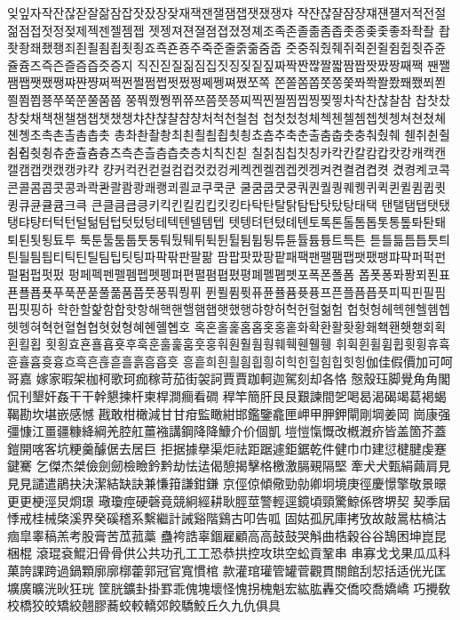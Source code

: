 잊잎자작잔잖잗잘잚잠잡잣잤장잦재잭잰잴잼잽잿쟀쟁쟈
쟉쟌쟎쟐쟘쟝쟤쟨쟬저적전절젊점접젓정젖제젝젠젤젬젭
젯젱져젼졀졈졉졌졍졔조족존졸졺좀좁좃종좆좇좋좌좍좔
좝좟좡좨좼좽죄죈죌죔죕죗죙죠죡죤죵주죽준줄줅줆줌줍
줏중줘줬줴쥐쥑쥔쥘쥠쥡쥣쥬쥰쥴쥼즈즉즌즐즘즙즛증지
직진짇질짊짐집짓징짖짙짚짜짝짠짢짤짧짬짭짯짰짱째짹
짼쨀쨈쨉쨋쨌쨍쨔쨘쨩쩌쩍쩐쩔쩜쩝쩟쩠쩡쩨쩽쪄쪘쪼쪽
쫀쫄쫌쫍쫏쫑쫓쫘쫙쫠쫬쫴쬈쬐쬔쬘쬠쬡쭁쭈쭉쭌쭐쭘쭙
쭝쭤쭸쭹쮜쮸쯔쯤쯧쯩찌찍찐찔찜찝찡찢찧차착찬찮찰참
찹찻찼창찾채책챈챌챔챕챗챘챙챠챤챦챨챰챵처척천철첨
첩첫첬청체첵첸첼쳄쳅쳇쳉쳐쳔쳤쳬쳰촁초촉촌촐촘촙촛
총촤촨촬촹최쵠쵤쵬쵭쵯쵱쵸춈추축춘출춤춥춧충춰췄췌
췐취췬췰췸췹췻췽츄츈츌츔츙츠측츤츨츰츱츳층치칙친칟
칠칡침칩칫칭카칵칸칼캄캅캇캉캐캑캔캘캠캡캣캤캥캬캭
컁커컥컨컫컬컴컵컷컸컹케켁켄켈켐켑켓켕켜켠켤켬켭켯
켰켱켸코콕콘콜콤콥콧콩콰콱콴콸쾀쾅쾌쾡쾨쾰쿄쿠쿡쿤
쿨쿰쿱쿳쿵쿼퀀퀄퀑퀘퀭퀴퀵퀸퀼큄큅큇큉큐큔큘큠크큭
큰클큼큽킁키킥킨킬킴킵킷킹타탁탄탈탉탐탑탓탔탕태택
탠탤탬탭탯탰탱탸턍터턱턴털턺텀텁텃텄텅테텍텐텔템텝
텟텡텨텬텼톄톈토톡톤톨톰톱톳통톺톼퇀퇘퇴퇸툇툉툐투
툭툰툴툼툽툿퉁퉈퉜퉤튀튁튄튈튐튑튕튜튠튤튬튱트특튼
튿틀틂틈틉틋틔틘틜틤틥티틱틴틸팀팁팃팅파팍팎판팔팖
팜팝팟팠팡팥패팩팬팰팸팹팻팼팽퍄퍅퍼퍽펀펄펌펍펏펐
펑페펙펜펠펨펩펫펭펴편펼폄폅폈평폐폘폡폣포폭폰폴폼
폽폿퐁퐈퐝푀푄표푠푤푭푯푸푹푼푿풀풂품풉풋풍풔풩퓌
퓐퓔퓜퓟퓨퓬퓰퓸퓻퓽프픈플픔픕픗피픽핀필핌핍핏핑하
학한할핥함합핫항해핵핸핼햄햅햇했행햐향허헉헌헐헒험
헙헛헝헤헥헨헬헴헵헷헹혀혁현혈혐협혓혔형혜혠혤혭호
혹혼홀홅홈홉홋홍홑화확환활홧황홰홱홴횃횅회획횐횔횝
횟횡효횬횰횹횻후훅훈훌훑훔훗훙훠훤훨훰훵훼훽휀휄휑
휘휙휜휠휨휩휫휭휴휵휸휼흄흇흉흐흑흔흖흗흘흙흠흡흣
흥흩희흰흴흼흽힁히힉힌힐힘힙힛힝伽佳假價加可呵哥嘉
嫁家暇架枷柯歌珂痂稼苛茄街袈訶賈賈跏軻迦駕刻却各恪
慤殼珏脚覺⾓角閣侃刊墾奸姦⼲干幹懇揀杆柬桿澗癎看磵
稈竿簡肝⾉艮艱諫間乫喝曷渴碣竭葛褐蝎鞨勘坎堪嵌感憾
戡敢柑橄減⽢甘疳監瞰紺邯鑑鑒龕匣岬甲胛鉀閘剛堈姜岡
崗康强彊慷江畺疆糠絳綱羌腔舡薑襁講鋼降降鱇介价個凱
塏愷愾慨改槪漑疥皆盖箇芥蓋鎧開喀客坑粳羹醵倨去居巨
拒据據擧渠炬祛距踞遽鉅鋸乾件健⼱巾建愆楗腱虔蹇鍵騫
乞傑杰桀儉劍劒檢瞼鈐黔劫怯迲偈憩揭擊格檄激膈覡隔堅
牽⽝犬甄絹繭肩⾒見見譴遣鵑抉決潔結缺訣兼慊箝謙鉗鎌
京俓倞傾儆勁勍卿坰境庚徑慶憬擎敬景暻更更梗涇炅烱璟
璥瓊痙硬磬竟競絅經耕耿脛莖警輕逕鏡頃頸驚鯨係啓堺契
契季屆悸戒桂械棨溪界癸磎稽系繫繼計誡谿階鷄古叩告呱
固姑孤尻庫拷攷故敲暠枯槁沽痼皐睾稿羔考股膏苦苽菰藁
蠱袴誥辜錮雇顧⾼高⿎鼓哭斛曲梏穀⾕谷鵠困坤崑昆梱棍
滾琨袞鯤汨⾻骨供公共功孔⼯工恐恭拱控攻珙空蚣貢鞏串
串寡⼽戈果⽠瓜科菓誇課跨過鍋顆廓廓槨藿郭冠官寬慣棺
款灌琯瓘管罐菅觀貫關館刮恝括适侊光匡壙廣曠洸炚狂珖
筐胱鑛卦掛罫乖傀塊壞怪愧拐槐魁宏紘肱轟交僑咬喬嬌嶠
巧攪敎校橋狡皎矯絞翹膠蕎蛟較轎郊餃驕鮫丘久九仇俱具
